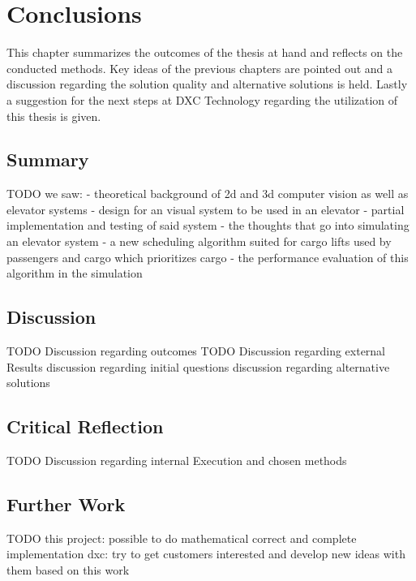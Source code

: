 \chapter{Conclusions}
\label{chap:concl}

This chapter summarizes the outcomes of the thesis at hand 
and reflects on the conducted methods.
Key ideas of the previous chapters are pointed out and a discussion regarding the solution quality and alternative solutions is held.
Lastly a suggestion for the next steps at DXC Technology regarding the utilization of this thesis is given.

\section{Summary}

TODO
we saw:
- theoretical background of 2d and 3d computer vision as well as elevator systems
- design for an visual system to be used in an elevator
- partial implementation and testing of said system
- the thoughts that go into simulating an elevator system
- a new scheduling algorithm suited for cargo lifts used by passengers and cargo
which prioritizes cargo
- the performance evaluation of this algorithm in the simulation


\section{Discussion}

TODO Discussion regarding outcomes
TODO Discussion regarding external Results
discussion regarding initial questions
discussion regarding alternative solutions


\section{Critical Reflection}

TODO  Discussion regarding internal Execution and chosen methods

\section{Further Work}

TODO
this project: possible to do mathematical correct and complete implementation
dxc: try to get customers interested and develop new ideas with them based on this work

